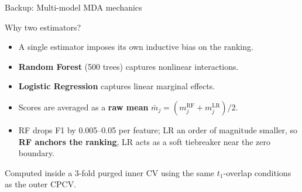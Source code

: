 \documentclass[aspectratio=169, t]{beamer}
\begin{document}
\begin{frame}{Backup: Multi-model MDA mechanics}
\vspace{-0.6em}

{
\begin{block}{Why two estimators?}
\footnotesize
\begin{itemize}\setlength{\itemsep}{1pt}
  \item A single estimator imposes its own inductive bias on the ranking.
  \item \textbf{Random Forest} (500 trees) captures nonlinear interactions.
  \item \textbf{Logistic Regression} captures linear marginal effects.
  \item Scores are averaged as a \textbf{raw mean} $\bar{m}_j = (m^{\mathrm{RF}}_j + m^{\mathrm{LR}}_j)/2$.
  \item RF drops F1 by 0.005--0.05 per feature; LR an order of magnitude smaller, so \textbf{RF anchors the ranking}, LR acts as a soft tiebreaker near the zero boundary.
\end{itemize}
\end{block}
}

\vspace{0.3em}
\centering
{\footnotesize Computed inside a 3-fold purged inner CV using the same $t_1$-overlap conditions as the outer CPCV.}
\end{frame}
\end{document}
